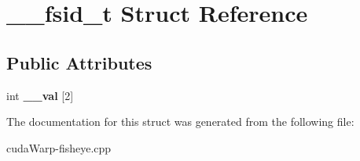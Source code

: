 \hypertarget{struct____fsid__t}{}\section{\+\_\+\+\_\+fsid\+\_\+t Struct Reference}
\label{struct____fsid__t}
\subsection*{Public Attributes}
\begin{DoxyCompactItemize}
\item 
int {\bfseries \+\_\+\+\_\+val} \mbox{[}2\mbox{]}\hypertarget{struct____fsid__t_abd0c45ab8b798c55028420f6c071a252}{}\label{struct____fsid__t_abd0c45ab8b798c55028420f6c071a252}

\end{DoxyCompactItemize}


The documentation for this struct was generated from the following file\+:\begin{DoxyCompactItemize}
\item 
cuda\+Warp-\/fisheye.\+cpp\end{DoxyCompactItemize}
